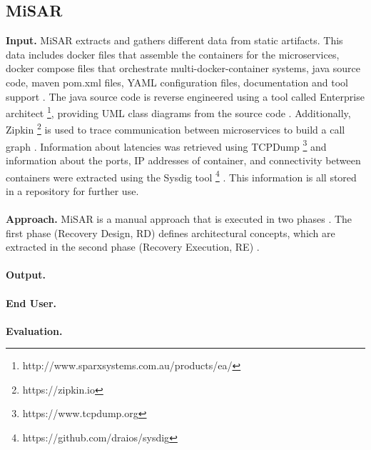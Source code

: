 \subsection{MiSAR}
\label{sec:Results:MiSAR}
\textbf{Input.}
MiSAR extracts and gathers different data from static artifacts.
This data includes docker files that assemble the containers for the microservices, docker compose files that orchestrate multi-docker-container systems, java source code, maven pom.xml files, YAML configuration files, documentation and tool support \cite{Alshuqayran2018MiSAR}.
The java source code is reverse engineered using a tool called Enterprise architect \footnote{http://www.sparxsystems.com.au/products/ea/}, providing UML class diagrams from the source code \cite{Alshuqayran2018MiSAR}.
Additionally, Zipkin \footnote{https://zipkin.io} is used to trace communication between microservices to build a call graph \cite{Alshuqayran2018MiSAR}.
Information about latencies was retrieved using TCPDump \footnote{https://www.tcpdump.org} and information about the ports, IP addresses of container, and connectivity between containers were extracted using the Sysdig tool \footnote{https://github.com/draios/sysdig} \cite{Alshuqayran2018MiSAR}.
This information is all stored in a repository for further use.
\\ \\
\textbf{Approach.}
MiSAR is a manual approach that is executed in two phases \cite{Alshuqayran2018MiSAR}.
The first phase (Recovery Design, RD) defines architectural concepts, which are extracted in the second phase (Recovery Execution, RE) \cite{Alshuqayran2018MiSAR}.
\\ \\
\textbf{Output.}
\\ \\
\textbf{End User.}
\\ \\
\textbf{Evaluation.}

